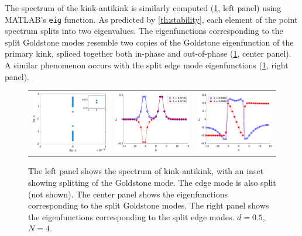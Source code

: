 \documentclass[12pt,reqno]{amsart}
\begin{document}
The spectrum of the kink-antikink is similarly computed (\cref{fig:kakspec}, left panel) using MATLAB's \texttt{eig} function. As predicted by \cref{th:stability}, each element of the point spectrum splits into two eigenvalues. The eigenfunctions corresponding to the split Goldstone modes resemble two copies of the Goldstone eigenfunction of the primary kink, spliced together both in-phase and out-of-phase (\cref{fig:kakspec}, center panel). A similar phenomenon occurs with the split edge mode eigenfunctions (\cref{fig:kakspec}, right panel).

\begin{figure}
	\begin{center}
	\begin{tabular}{ccc}
	\includegraphics[width=5cm]{kak50_8spec.eps}	&
	\includegraphics[width=5cm]{kak50_8goldstone.eps} &
	\includegraphics[width=5cm]{kak50_8edge.eps}
	\end{tabular}
	\end{center}
	\caption{The left panel shows the spectrum of kink-antikink, with an
	inset showing splitting of the Goldstone mode. The edge mode is also split (not shown). The center panel shows the eigenfunctions corresponding to the split Goldstone modes. The right panel shows the eigenfunctions corresponding to the split edge modes. $d = 0.5$, $N = 4$.}
	\label{fig:kakspec}
\end{figure}
\end{document}
